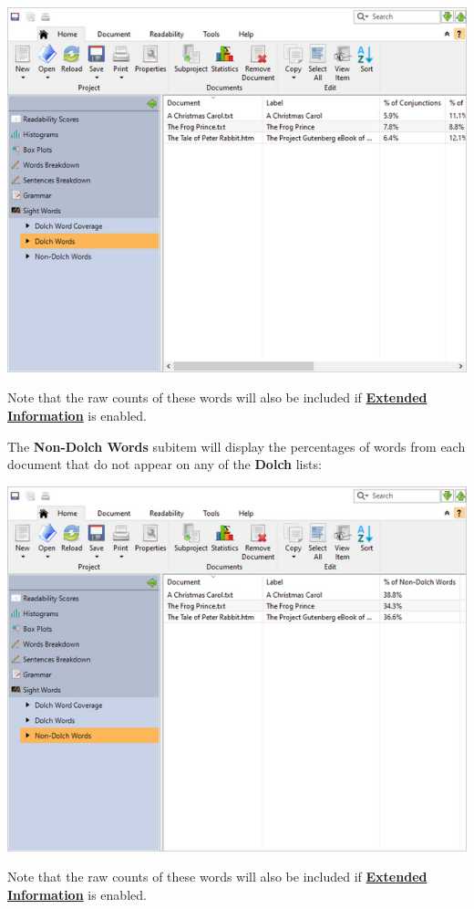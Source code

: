 \documentclass[
]{book}
\theoremstyle{definition}
\theoremstyle{definition}
\theoremstyle{definition}
\theoremstyle{definition}
\theoremstyle{remark}
\begin{document}
\includegraphics{Images/batchdolchwords.png}

Note that the raw counts of these words will also be included if \protect\hyperlink{options-summary-report}{\textbf{Extended Information}} is enabled.

The \textbf{Non-Dolch Words} subitem will display the percentages of words from each document that do not appear on any of the \textbf{Dolch} lists:

\includegraphics{Images/batchdolchnonwords.png}

Note that the raw counts of these words will also be included if \protect\hyperlink{options-summary-report}{\textbf{Extended Information}} is enabled.
\end{document}
